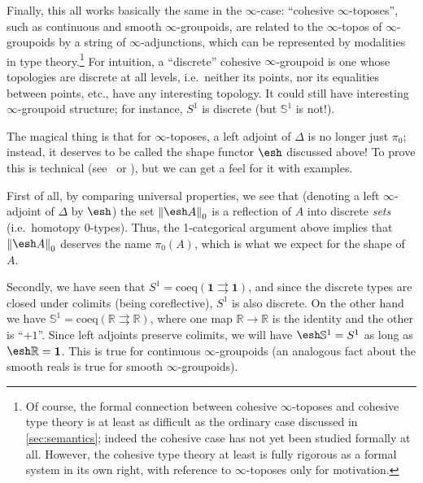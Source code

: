 \documentclass[12pt]{article}
\def\oo{\ensuremath{\infty}}
\def\R{\mathbb{R}}
\def\hocirc{S^1}
\def\topcirc{\mathbb{S}^1}
\def\unit{\mathbf{1}}
\numberwithin{equation}{section}
\newcommand{\trunc}[2]{\mathopen{}\left\Vert #2\right\Vert_{#1}\mathclose{}}
\newcommand{\shape}{\ensuremath{\mathord{\raisebox{0.5pt}{\text{\rm\esh}}}}}
\begin{document}
Finally, this all works basically the same in the \oo-case: ``cohesive \oo-toposes'', such as continuous and smooth \oo-groupoids, are related to the \oo-topos of \oo-groupoids by a string of \oo-adjunctions, which can be represented by modalities in type theory.\footnote{Of course, the formal connection between cohesive \oo-toposes and cohesive type theory is at least as difficult as the ordinary case discussed in \cref{sec:semantics}; indeed the cohesive case has not yet been studied formally at all.
However, the cohesive type theory at least is fully rigorous as a formal system in its own right, with reference to \oo-toposes only for motivation.}
For intuition, a ``discrete'' cohesive \oo-groupoid is one whose topologies are discrete at all levels, i.e.\ neither its points, nor its equalities between points, etc., have any interesting topology.
It could still have interesting \oo-groupoid structure; for instance, $\hocirc$ is discrete (but $\topcirc$ is not!).

The magical thing is that for $\oo$-toposes, a left adjoint of $\Delta$ is no longer just $\pi_0$; instead, it deserves to be called the shape functor $\shape$ discussed above!
To prove this is technical (see~\cite[Proposition 4.3.32]{schreiber:dcct} or \cite[\S3]{carchedi:hotyorb}), but we can get a feel for it with examples.

First of all, by comparing universal properties, we see that (denoting a left \oo-adjoint of $\Delta$ by $\shape$) the set $\trunc 0{\shape A}$ is a reflection of $A$ into discrete \emph{sets} (i.e.\ homotopy 0-types).
Thus, the 1-categorical argument above implies that $\trunc 0{\shape A}$ deserves the name $\pi_0(A)$, which is what we expect for the shape of $A$.

Secondly, %
we have seen that $\hocirc = \mathrm{coeq}(\unit\rightrightarrows\unit)$, and since the discrete types are closed under colimits (being coreflective), $\hocirc$ is also discrete.
On the other hand we have $\topcirc = \mathrm{coeq}(\R \rightrightarrows \R)$, where one map $\R\to\R$ is the identity and the other is ``$+1$''.
Since left adjoints preserve colimits, we will have $\shape\topcirc = \hocirc$ as long as $\shape \R=\unit$.
This is true for continuous $\oo$-groupoids (an analogous fact about the smooth reals is true for smooth $\oo$-groupoids).
\end{document}
